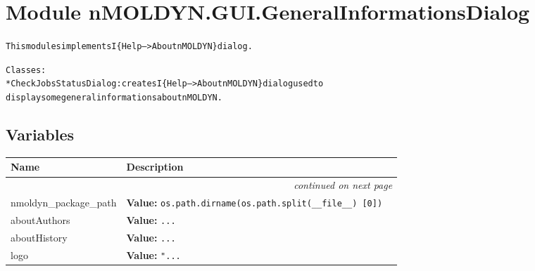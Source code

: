 %
%
%


\section{Module nMOLDYN.GUI.GeneralInformationsDialog}

    \label{nMOLDYN:GUI:GeneralInformationsDialog}
\begin{alltt}
This modules implements I\{Help--{\textgreater}About nMOLDYN\} dialog.

Classes:
    * CheckJobsStatusDialog: creates I\{Help--{\textgreater}About nMOLDYN\} dialog used to 
    display some general informations about nMOLDYN.
\end{alltt}



  \subsection{Variables}

    \vspace{-1cm}
\hspace{\varindent}\begin{longtable}{|p{\varnamewidth}|p{\vardescrwidth}|l}
\cline{1-2}
\cline{1-2} \centering \textbf{Name} & \centering \textbf{Description}& \\
\cline{1-2}
\endhead\cline{1-2}\multicolumn{3}{r}{\small\textit{continued on next page}}\\\endfoot\cline{1-2}
\endlastfoot\raggedright n\-m\-o\-l\-d\-y\-n\-\_\-p\-a\-c\-k\-a\-g\-e\-\_\-p\-a\-t\-h\- & \raggedright \textbf{Value:} 
{\tt os.path.dirname(os.path.split(\_\_file\_\_) [0])}&\\
\cline{1-2}
\raggedright a\-b\-o\-u\-t\-A\-u\-t\-h\-o\-r\-s\- & \raggedright \textbf{Value:} 
{\tt \texttt{...}}&\\
\cline{1-2}
\raggedright a\-b\-o\-u\-t\-H\-i\-s\-t\-o\-r\-y\- & \raggedright \textbf{Value:} 
{\tt \texttt{...}}&\\
\cline{1-2}
\raggedright l\-o\-g\-o\- & \raggedright \textbf{Value:} 
{\tt "\texttt{...}}&\\
\cline{1-2}
\end{longtable}


